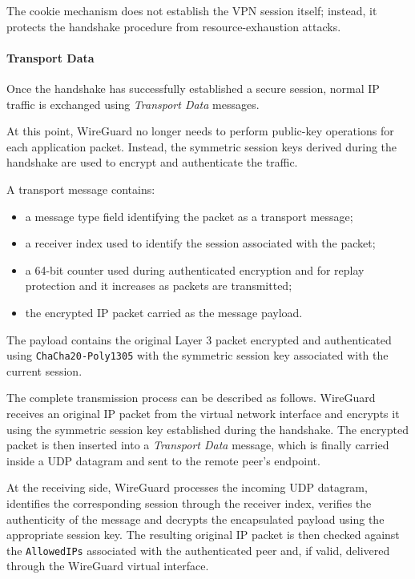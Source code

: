 The cookie mechanism does not establish the VPN session itself; instead, it protects the handshake procedure from resource-exhaustion attacks.

\paragraph{Transport Data}

Once the handshake has successfully established a secure session, normal IP traffic is exchanged using \textit{Transport Data} messages.

At this point, WireGuard no longer needs to perform public-key operations for each application packet. Instead, the symmetric session keys derived during the handshake are used to encrypt and authenticate the traffic.

A transport message contains:
\begin{itemize}
	\item a message type field identifying the packet as a transport message;
	\item a receiver index used to identify the session associated with the packet;
	\item a 64-bit counter used during authenticated encryption and for replay protection and it increases as packets are transmitted;
	\item the encrypted IP packet carried as the message payload.
\end{itemize}

The payload contains the original Layer 3 packet encrypted and authenticated using \texttt{ChaCha20-Poly1305} with the symmetric session key associated with the current session.

\medskip

The complete transmission process can be described as follows. WireGuard receives an original IP packet from the virtual network interface and encrypts it using the symmetric session key established during the handshake. The encrypted packet is then inserted into a \textit{Transport Data} message, which is finally carried inside a UDP datagram and sent to the remote peer's endpoint.

At the receiving side, WireGuard processes the incoming UDP datagram, identifies the corresponding session through the receiver index, verifies the authenticity of the message and decrypts the encapsulated payload using the appropriate session key. The resulting original IP packet is then checked against the \texttt{AllowedIPs} associated with the authenticated peer and, if valid, delivered through the WireGuard virtual interface.

